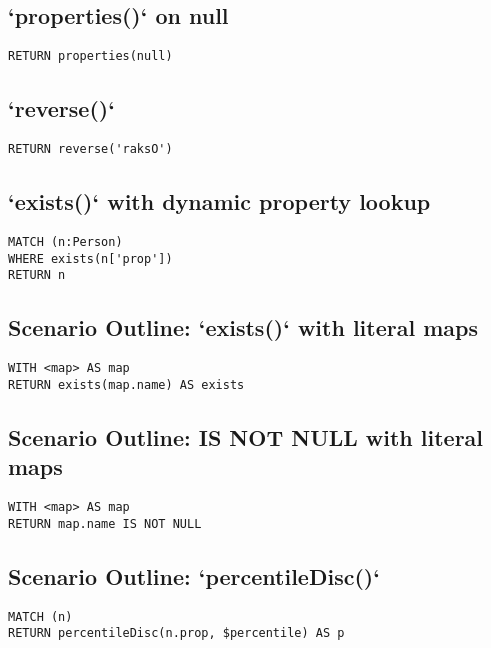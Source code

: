 \subsection{`properties()` on null}

\begin{lstlisting}
RETURN properties(null)
\end{lstlisting}

\subsection{`reverse()`}

\begin{lstlisting}
RETURN reverse('raksO')
\end{lstlisting}

\subsection{`exists()` with dynamic property lookup}

\begin{lstlisting}
MATCH (n:Person)
WHERE exists(n['prop'])
RETURN n
\end{lstlisting}

\subsection{Scenario Outline: `exists()` with literal maps}

\begin{lstlisting}
WITH <map> AS map
RETURN exists(map.name) AS exists
\end{lstlisting}

\subsection{Scenario Outline: IS NOT NULL with literal maps}

\begin{lstlisting}
WITH <map> AS map
RETURN map.name IS NOT NULL
\end{lstlisting}

\subsection{Scenario Outline: `percentileDisc()`}

\begin{lstlisting}
MATCH (n)
RETURN percentileDisc(n.prop, $percentile) AS p
\end{lstlisting}

